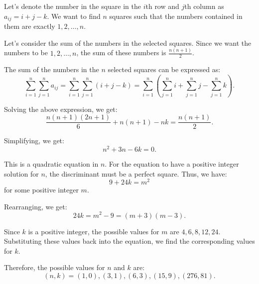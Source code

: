 Let's denote the number in the square in the \(i\)th row and \(j\)th column as \(a_{ij} = i+j-k\). We want to find \(n\) squares such that the numbers contained in them are exactly \(1,2,\dots,n\).

Let's consider the sum of the numbers in the selected squares. Since we want the numbers to be \(1,2,\dots,n\), the sum of these numbers is \(\frac{n(n+1)}{2}\).

The sum of the numbers in the \(n\) selected squares can be expressed as:
\[\sum_{i=1}^{n} \sum_{j=1}^{n} a_{ij} = \sum_{i=1}^{n} \sum_{j=1}^{n} (i+j-k) = \sum_{i=1}^{n} \left( \sum_{j=1}^{n} i + \sum_{j=1}^{n} j - \sum_{j=1}^{n} k \right).\]

Solving the above expression, we get:
\[\frac{n(n+1)(2n+1)}{6} + n(n+1) - nk = \frac{n(n+1)}{2}.\]

Simplifying, we get:
\[n^2 + 3n - 6k = 0.\]

This is a quadratic equation in \(n\). For the equation to have a positive integer solution for \(n\), the discriminant must be a perfect square. Thus, we have:
\[9 + 24k = m^2\]
for some positive integer \(m\).

Rearranging, we get:
\[24k = m^2 - 9 = (m+3)(m-3).\]

Since \(k\) is a positive integer, the possible values for \(m\) are \(4, 6, 8, 12, 24\). Substituting these values back into the equation, we find the corresponding values for \(k\).

Therefore, the possible values for \(n\) and \(k\) are:
\[(n,k) = (1,0), (3,1), (6,3), (15,9), (276,81).\]

